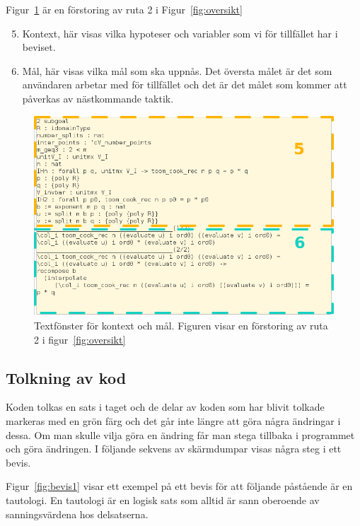 Figur~\ref{fig:kontext} är en förstoring av ruta 2 i Figur~\ref{fig:oversikt}
\begin{enumerate}
  \setcounter{enumi}{4}
\item Kontext, här visas vilka hypoteser och variabler som vi för tillfället
  har i beviset.
\item Mål, här visas vilka mål som ska uppnås. Det översta målet är det som
  användaren arbetar med för tillfället och det är det målet som kommer att
  påverkas av nästkommande taktik.
\end{enumerate}

\begin{figure}[H]
  \centering
  \includegraphics[width=\textwidth]{images/Kontext}
  \caption[Fönster för kontext och mål]
   {Textfönster för kontext och mål. Figuren visar en förstoring av ruta 2 i
    figur~\ref{fig:oversikt}}
  \label{fig:kontext}
\end{figure}

\subsection{Tolkning av kod}
Koden tolkas en sats i taget och de delar av koden som har blivit tolkade
markeras med en grön färg och det går inte längre att göra några ändringar i
dessa. Om man skulle vilja göra en ändring får man stega tillbaka i programmet
och göra ändringen. I följande sekvens av skärmdumpar visas några steg i ett
bevis.

Figur~\ref{fig:bevis1} visar ett exempel på ett bevis för att följande
påstående är en tautologi. En tautologi är en logisk sats som alltid är sann
oberoende av sanningsvärdena hos delsatserna.

